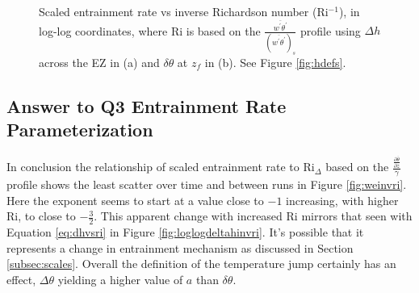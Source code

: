 \begin{figure}[htbp]
\begin{minipage}[b]{0.5\linewidth}
        \\
        \end{minipage}             
\quad
\begin{minipage}[b]{0.5\linewidth}
        \\
       
       \end{minipage}
        \caption[Scaled entrainment rate vs inverse Richardson number (ii)]{Scaled entrainment rate vs inverse Richardson number (\acs{Ri}$^{-1}$), in log-log coordinates, where \acs{Ri} is based on the $\frac{\overline{w^{'}\theta^{'}}}{(\overline{w^{'}\theta^{'}})_{s}}$
profile using $\Delta h$ across the \acs{EZ} in (a) and $\delta \theta$ at $z_{f}$ in (b).  See Figure \ref{fig:hdefs}.}
        \label{fig:weinvri_f}
\end{figure}

\subsection{Answer to Q3 Entrainment Rate Parameterization}
In conclusion the relationship of scaled entrainment rate to \acs{Ri}$_{\Delta}$ based on the $\frac{\frac{\partial \overline{\theta}}{\partial z}}{\gamma}$ profile shows the least scatter over time and between runs in Figure \ref{fig:weinvri}.  Here the exponent seems to start at a value close to $-1$ increasing, with higher \acs{Ri}, to close to $-\frac{3}{2}$.  This apparent change with increased \acs{Ri} mirrors that seen with Equation \ref{eq:dhvsri} in Figure \ref{fig:loglogdeltahinvri}.  It's possible that it represents a change in entrainment mechanism as discussed in Section \ref{subsec:scales}.  Overall the definition of the temperature jump certainly has an effect, $\Delta \theta$ yielding a higher value of $a$ than $\delta \theta$.

\endinput

Any text after an \endinput is ignored.
You could put scraps here or things in progress.
